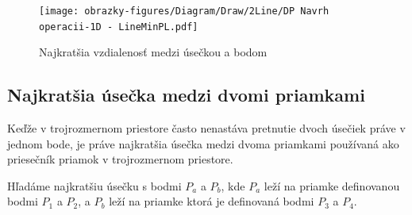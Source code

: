 \begin{figure}[H]
	\centering
	\texttt{[image: obrazky-figures/Diagram/Draw/2Line/DP Navrh operacii-1D -  LineMinPL.pdf]}
	\caption{Najkratšia vzdialenosť medzi úsečkou a bodom}
	\label{fig:LineMinPL}
\end{figure}

\subsection*{Najkratšia úsečka medzi dvomi priamkami}
Keďže v trojrozmernom priestore často nenastáva pretnutie dvoch úsečiek práve v jednom bode, je práve najkratšia úsečka medzi dvoma priamkami používaná ako priesečník priamok v trojrozmernom priestore.


Hľadáme najkratšiu úsečku s bodmi $P_a$ a $P_b$, kde $P_a$ leží na priamke definovanou bodmi $P_1$ a $P_2$, a $P_b$ leží na priamke ktorá je definovaná bodmi $P_3$ a $P_4$.

